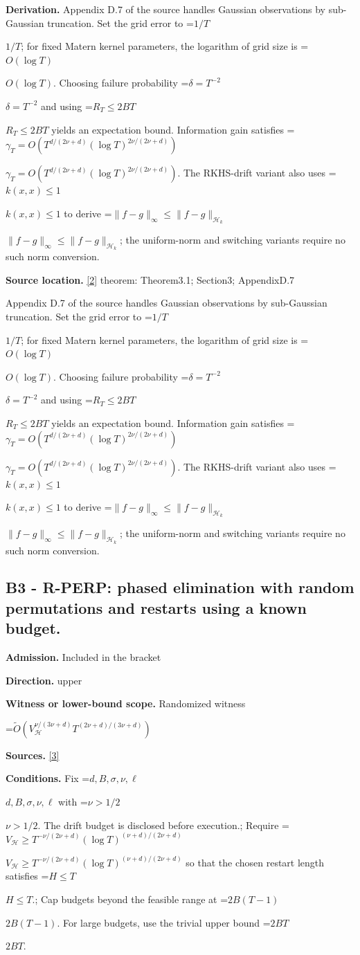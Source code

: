 \documentclass[10pt,a4paper]{article}
\newcommand{\AtlasMath}[1]{\par\begingroup\centering\setbox0=\hbox{$\displaystyle #1$}\ifdim\wd0>1.4\linewidth\typeout{ATLAS WIDE FORMULA: \the\wd0}\fi\ifdim\wd0>\linewidth\resizebox{\linewidth}{!}{\box0}\else\box0\fi\par\endgroup}
\newcommand{\AtlasInlineMath}[1]{\begingroup\setbox0=\hbox{$#1$}\ifdim\wd0>.4\linewidth\endgroup\AtlasMath{#1}\else\endgroup$#1$\fi}
\begin{document}
\textbf{Derivation.} Appendix D.7 of the source handles Gaussian observations by sub-Gaussian truncation. Set the grid error to \AtlasInlineMath{1/T}; for fixed Matern kernel parameters, the logarithm of grid size is \AtlasInlineMath{O(\log T)}. Choosing failure probability \AtlasInlineMath{\delta=T^{-2}} and using \AtlasInlineMath{R_T\le2BT} yields an expectation bound. Information gain satisfies \AtlasInlineMath{\gamma_T=O(T^{d/(2\nu+d)}(\log T)^{2\nu/(2\nu+d)})}. The RKHS-drift variant also uses \AtlasInlineMath{k(x,x)\le1} to derive \AtlasInlineMath{\|f-g\|_\infty\le\|f-g\|_{\mathcal H_k}}; the uniform-norm and switching variants require no such norm conversion.

\textbf{Source location.} \href{https://proceedings.mlr.press/v206/hong23b.html}{[2]} theorem: Theorem3.1; Section3; AppendixD.7

Appendix D.7 of the source handles Gaussian observations by sub-Gaussian truncation. Set the grid error to \AtlasInlineMath{1/T}; for fixed Matern kernel parameters, the logarithm of grid size is \AtlasInlineMath{O(\log T)}. Choosing failure probability \AtlasInlineMath{\delta=T^{-2}} and using \AtlasInlineMath{R_T\le2BT} yields an expectation bound. Information gain satisfies \AtlasInlineMath{\gamma_T=O(T^{d/(2\nu+d)}(\log T)^{2\nu/(2\nu+d)})}. The RKHS-drift variant also uses \AtlasInlineMath{k(x,x)\le1} to derive \AtlasInlineMath{\|f-g\|_\infty\le\|f-g\|_{\mathcal H_k}}; the uniform-norm and switching variants require no such norm conversion.

\subsection{B3 - R-PERP: phased elimination with random permutations and restarts using a known budget.}
\textbf{Admission.} Included in the bracket

\textbf{Direction.} upper

\textbf{Witness or lower-bound scope.} Randomized witness

\AtlasMath{\widetilde{O}\!\left(V_{\mathcal{H}}^{\nu/(3\nu+d)}T^{(2\nu+d)/(3\nu+d)}\right)}
\textbf{Sources.} \href{https://proceedings.mlr.press/v258/iwazaki25a.html}{[3]}

\textbf{Conditions.} Fix \AtlasInlineMath{d,B,\sigma,\nu,\ell} with \AtlasInlineMath{\nu>1/2}. The drift budget is disclosed before execution.; Require \AtlasInlineMath{V_{\mathcal H}\ge T^{-\nu/(2\nu+d)}(\log T)^{(\nu+d)/(2\nu+d)}} so that the chosen restart length satisfies \AtlasInlineMath{H\le T}.; Cap budgets beyond the feasible range at \AtlasInlineMath{2B(T-1)}. For large budgets, use the trivial upper bound \AtlasInlineMath{2BT}.
\end{document}
